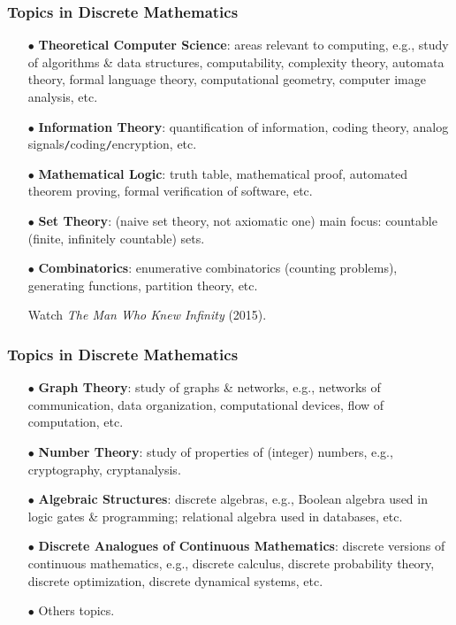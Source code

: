 \documentclass{beamer}
\begin{document}
\begin{frame}
	\frametitle{Topics in Discrete Mathematics}
	\begin{itemize}
		\item[$\bullet$] {\bf Theoretical Computer Science}: areas relevant to computing, e.g., study of algorithms \& data structures, computability, complexity theory, automata theory, formal language theory, computational geometry, computer image analysis, etc. 
		\item[$\bullet$] {\bf Information Theory}: quantification of information, coding theory, analog signals{\tt/}coding{\tt/}encryption, etc.
		\item[$\bullet$] {\bf Mathematical Logic}: truth table, mathematical proof, automated theorem proving, formal verification of software, etc.
		\item[$\bullet$] {\bf Set Theory}: (naive set theory, not axiomatic one) main focus: countable (finite, infinitely countable) sets.
		\item[$\bullet$] {\bf Combinatorics}: enumerative combinatorics (counting problems), generating functions, partition theory, etc.
		
		Watch {\it The Man Who Knew Infinity} (2015).
	\end{itemize}
\end{frame}

\begin{frame}
	\frametitle{Topics in Discrete Mathematics}
	\begin{itemize}
		\item[$\bullet$] {\bf Graph Theory}: study of graphs \& networks, e.g., networks of communication, data organization, computational devices, flow of computation, etc.
		\item[$\bullet$] {\bf Number Theory}: study of properties of (integer) numbers, e.g., cryptography, cryptanalysis.
		\item[$\bullet$] {\bf Algebraic Structures}: discrete algebras, e.g., Boolean algebra used in logic gates \& programming; relational algebra used in databases, etc.
		\item[$\bullet$] {\bf Discrete Analogues of Continuous Mathematics}: discrete versions of continuous mathematics, e.g., discrete calculus, discrete probability theory, discrete optimization, discrete dynamical systems, etc.
		\item[$\bullet$] Others topics.
	\end{itemize}
\end{frame}
\end{document}
